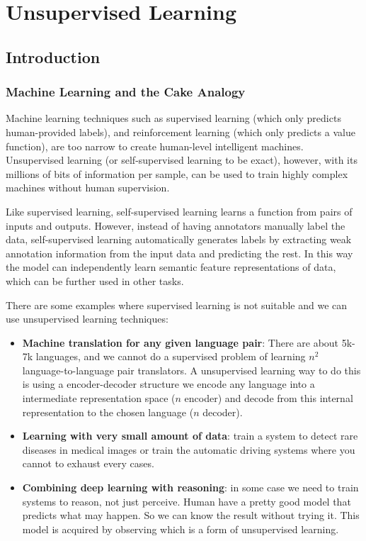 \chapter{Unsupervised Learning}

\section{Introduction}

\subsection{Machine Learning and the Cake Analogy}

Machine learning techniques such as supervised learning (which only predicts human-provided labels), and reinforcement learning (which only predicts a value function), are too narrow to create human-level intelligent machines. Unsupervised learning (or self-supervised learning to be exact), however, with its millions of bits of information per sample, can be used to train highly complex machines without human supervision.

Like supervised learning, self-supervised learning learns a function from pairs of inputs and outputs. However, instead of having annotators manually label the data, self-supervised learning automatically generates labels by extracting weak annotation information from the input data and predicting the rest. In this way the model can independently learn semantic feature representations of data, which can be further used in other tasks.

There are some examples where supervised learning is not suitable and we can use unsupervised learning techniques:
\begin{itemize}
    \item \textbf{Machine translation for any given language pair}: There are about 5k-7k languages, and we cannot do a supervised problem of learning $n^2$ language-to-language pair translators. A unsupervised learning way to do this is using a encoder-decoder structure we encode any language into a intermediate representation space ($n$ encoder) and decode from this internal representation to the chosen language ($n$ decoder).

    \item \textbf{Learning with very small amount of data}: train a system to detect rare diseases in medical images or train the automatic driving systems where you cannot to exhaust every cases.

    \item \textbf{Combining deep learning with reasoning}: in some case we need to train systems to reason, not just perceive. Human have a pretty good model that predicts what may happen. So we can know the result without trying it. This model is acquired by observing which is a form of unsupervised learning.
\end{itemize}

